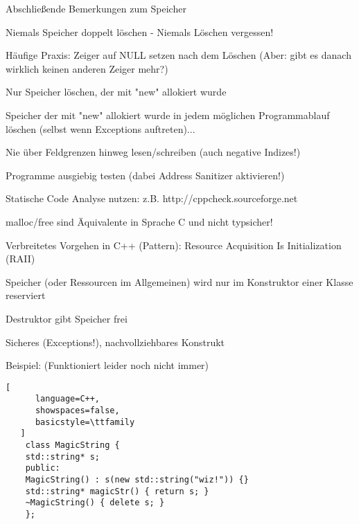 \documentclass[10pt]{article}
\begin{document}
\begin{itemize*}
\begin{itemize*}
  \item Abschließende Bemerkungen zum Speicher
  \begin{itemize*}
    \item Niemals Speicher doppelt löschen - Niemals Löschen vergessen!
    \item Häufige Praxis: Zeiger auf NULL setzen nach dem Löschen (Aber: gibt es danach wirklich keinen anderen Zeiger mehr?)
    \item Nur Speicher löschen, der mit "new" allokiert wurde
    \item Speicher der mit "new" allokiert wurde in jedem möglichen Programmablauf löschen (selbst wenn Exceptions auftreten)...
    \item Nie über Feldgrenzen hinweg lesen/schreiben (auch negative Indizes!)
    \item Programme ausgiebig testen (dabei Address Sanitizer aktivieren!)
    \item Statische Code Analyse nutzen: z.B. http://cppcheck.sourceforge.net
    \item malloc/free sind Äquivalente in Sprache C und nicht typsicher!
  \end{itemize*}
  
  \item Verbreitetes Vorgehen in C++ (Pattern): Resource Acquisition Is Initialization (RAII)
  \begin{itemize*}
    \item Speicher (oder Ressourcen im Allgemeinen) wird nur im Konstruktor einer Klasse reserviert
    \item Destruktor gibt Speicher frei
    \item Sicheres (Exceptions!), nachvollziehbares Konstrukt
    \item Beispiel: (Funktioniert leider noch nicht immer)
    \begin{lstlisting}[
      language=C++,
      showspaces=false,
      basicstyle=\ttfamily
   ]
    class MagicString {
    std::string* s;
    public:
    MagicString() : s(new std::string("wiz!")) {}
    std::string* magicStr() { return s; }
    ~MagicString() { delete s; }
    };
  \end{lstlisting}
  \end{itemize*}
\end{itemize*}


\end{itemize*}
\end{document}
